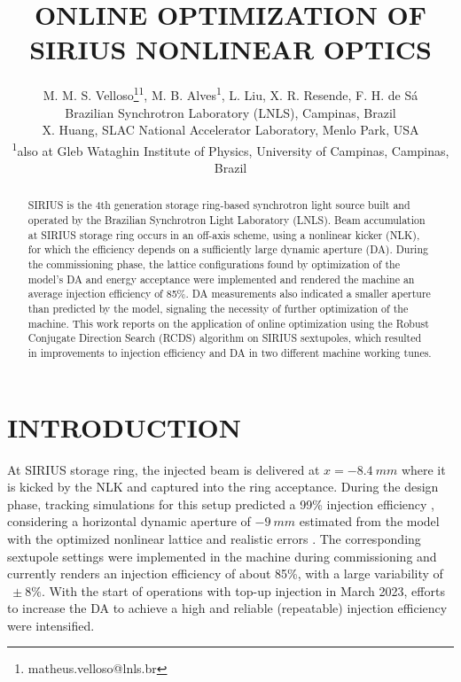 \documentclass[a4paper,
               keeplastbox,   %
               ]{jacow}
\begin{document}
\title{ONLINE OPTIMIZATION OF SIRIUS NONLINEAR OPTICS}

\author{M. M. S. Velloso\thanks{matheus.velloso@lnls.br}\textsuperscript{1}, M. B. Alves\textsuperscript{1}, L. Liu, X. R. Resende, F. H. de Sá\\ Brazilian Synchrotron Laboratory (LNLS), Campinas, Brazil \\
		X. Huang, SLAC National Accelerator Laboratory, Menlo Park, USA \\
		\textsuperscript{1}also at Gleb Wataghin Institute of Physics, University of Campinas, Campinas, Brazil 
}
	
\maketitle
%
\begin{abstract}
SIRIUS is the 4th generation storage ring-based synchrotron light source built and operated by the Brazilian Synchrotron Light Laboratory (LNLS). Beam accumulation at SIRIUS storage ring occurs in an off-axis scheme, using a nonlinear kicker (NLK), for which the efficiency depends on a sufficiently large dynamic aperture (DA). During the commissioning phase, the lattice configurations found by optimization of the model's DA and energy acceptance were implemented and rendered the machine an average injection efficiency of 85\%. DA measurements also indicated a smaller aperture than predicted by the model, signaling the necessity of further optimization of the machine. 
This work reports on the application of online optimization using the Robust Conjugate Direction Search (RCDS) algorithm on SIRIUS sextupoles, which resulted in improvements to injection efficiency and DA in two different machine working tunes. 
\end{abstract}

\section{INTRODUCTION}
At SIRIUS storage ring, the injected beam is delivered at $x=-8.4~\unit{mm}$ where it is kicked by the NLK and captured into the ring acceptance. During the design phase, tracking simulations for this setup predicted a 99\% injection efficiency \cite{Liu:IPAC2016-THPMR011}, considering a horizontal dynamic aperture of $-9~\unit{mm}$  estimated from the model with the optimized nonlinear lattice and realistic errors \cite{deSá:IPAC2016-THPMR012}.  The corresponding sextupole settings were implemented in the machine during commissioning and currently renders an injection efficiency of about 85\%, with a large variability of $~\pm8\%$. With the start of operations with top-up injection in March 2023, efforts to increase the DA to achieve a high and reliable (repeatable) injection efficiency were intensified. 
\end{document}
